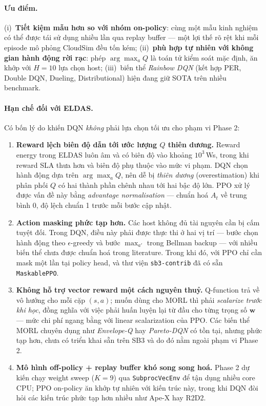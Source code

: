 \paragraph{Ưu điểm.} (i)~\textbf{Tiết kiệm mẫu hơn so với nhóm
on-policy}: cùng một mẫu kinh nghiệm có thể được tái sử dụng nhiều
lần qua replay buffer --- một lợi thế rõ rệt khi mỗi episode mô phỏng
CloudSim đều tốn kém; (ii)~\textbf{phù hợp tự nhiên với không gian
hành động rời rạc}: phép $\arg\max_a Q$ là toán tử kiểm soát mặc
định, ăn khớp với $H = 10$ lựa chọn host; (iii)~biến thể
\textit{Rainbow DQN} (kết hợp PER, Double DQN, Dueling, Distributional)
hiện đang giữ SOTA trên nhiều benchmark.

\paragraph{Hạn chế đối với ELDAS.} Có bốn lý do khiến DQN \emph{không}
phải lựa chọn tối ưu cho phạm vi Phase 2:
\begin{enumerate}
  \item \textbf{Reward lệch biên độ dẫn tới ước lượng $Q$ thiên dương.}
        Reward energy trong ELDAS luôn âm và có biên độ vào khoảng
        $10^3$\,Ws, trong khi reward SLA thưa hơn và biên độ phụ thuộc
        vào mức vi phạm. DQN chọn hành động dựa trên $\arg\max_a Q$,
        nên dễ bị \emph{thiên dương} (overestimation) khi phân phối
        $Q$ có hai thành phần chênh nhau tới hai bậc độ lớn. PPO xử lý
        được vấn đề này bằng \textit{advantage normalisation} ---
        chuẩn hoá $A_t$ về trung bình 0, độ lệch chuẩn 1 trước mỗi
        bước cập nhật.
  \item \textbf{Action masking phức tạp hơn.} Các host không đủ tài
        nguyên cần bị cấm tuyệt đối. Trong DQN, điều này phải được
        thực thi ở hai vị trí --- bước chọn hành động theo
        $\epsilon$-greedy và bước $\max_{a'}$ trong Bellman backup ---
        với nhiều biến thể chưa được chuẩn hoá trong literature.
        Trong khi đó, với PPO chỉ cần mask một lần tại policy head, và
        thư viện \texttt{sb3-contrib} đã có sẵn \texttt{MaskablePPO}.
  \item \textbf{Không hỗ trợ vector reward một cách nguyên thuỷ.}
        Q-function trả về vô hướng cho mỗi cặp $(s, a)$; muốn dùng
        cho MORL thì phải \emph{scalarize trước khi học}, đồng nghĩa
        với việc phải huấn luyện lại từ đầu cho từng trọng số
        $\mathbf{w}$ --- mức chi phí ngang bằng với linear
        scalarization của PPO. Các biến thể MORL chuyên dụng như
        \textit{Envelope-Q} hay \textit{Pareto-DQN} có tồn tại, nhưng
        phức tạp hơn, chưa có triển khai sẵn trên SB3 và do đó nằm
        ngoài phạm vi Phase 2.
  \item \textbf{Mô hình off-policy + replay buffer khó song song hoá.}
        Phase 2 dự kiến chạy weight sweep ($K = 9$) qua
        \texttt{SubprocVecEnv} để tận dụng nhiều core CPU; PPO
        on-policy ăn khớp tự nhiên với kiến trúc này, trong khi DQN
        đòi hỏi các kiến trúc phức tạp hơn nhiều như Ape-X hay R2D2.
\end{enumerate}

